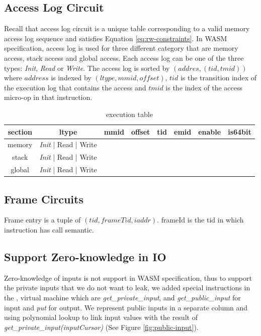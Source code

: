 \subsection{Access Log Circuit}
Recall that access log circuit is a unique table corresponding to a valid memory access log sequence and satisfies Equation \ref{eq:rw-constraints}. In WASM specification, access log is used for three different category that are memory access, stack access and global access. Each access log can be one of the three types: \emph{Init}, \emph{Read} or \emph{Write}. The access log is sorted by $(addres, (tid, tmid))$ where $address$ is indexed by $ (ltype, mmid, offset)$, $tid$ is the transition index of the execution log that contains the access and $tmid$ is the index of the access micro-op in that instruction.
\label{tbl: rw-table}
\begin{table}[!h]
\begin{center}
\begin{tabular}{ | c | c | c | c | c | c | c | c |}
  \hline
  section & ltype & mmid & offset & tid & emid & enable & is64bit\\ 
  \hline
  memory & \emph{Init} | Read | Write & & & & & &\\
  \hline
  stack & \emph{Init} | Read | Write & & & & & &\\
  \hline
  global & \emph{Init} | Read | Write & & & & & &\\
 \hline
\end{tabular}
\caption{execution table}
\label{tbl:ex-table}
\end{center}
\end{table}

\subsection{Frame Circuits}
Frame entry is a tuple of $(tid, frameTid, iaddr)$. 
frameId is the tid in which instruction has call semantic. 
\subsection{Support Zero-knowledge in IO}
Zero-knowledge of inputs is not support in WASM specification, thus to support the private inputs that we do not want to leak, we added special instructions in the \zkwasm, virtual machine which are \emph{get\_private\_input}, and \emph{get\_public\_input} for input and \emph{put} for output. We represent public inputs in a separate column and using polynomial lookup to link input values with the result of \emph{get\_private\_input(inputCursor)} (See Figure \ref{fig:public-input}).

